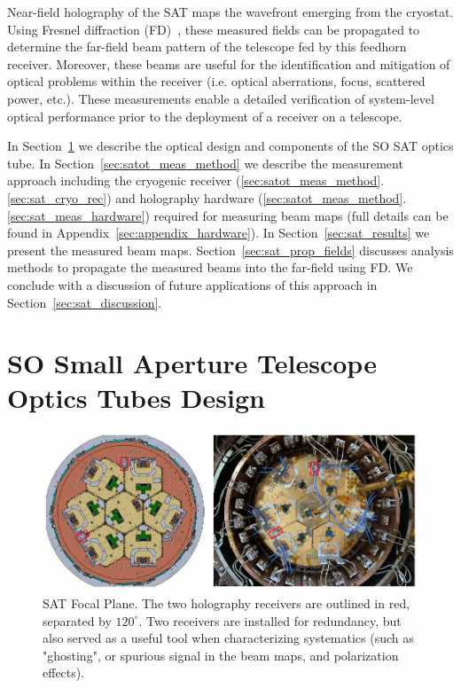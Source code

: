 Near-field holography of the SAT maps the wavefront emerging from the cryostat.  Using Fresnel diffraction (FD)~\cite{Goodman2005-ne}, these measured fields can be propagated to determine the far-field beam pattern of the telescope fed by this feedhorn receiver.  Moreover, these beams are useful for the identification and mitigation of optical problems within the receiver (i.e. optical aberrations, focus, scattered power, etc.).  These measurements enable a detailed verification of system-level optical performance prior to the deployment of a receiver on a telescope.

In Section~\ref{sec:sat_optics_tube} we describe the optical design and components of the SO SAT optics tube.  In Section~\ref{sec:satot_meas_method} we describe the measurement approach including the cryogenic receiver (\ref{sec:satot_meas_method}.\ref{sec:sat_cryo_rec}) and holography hardware (\ref{sec:satot_meas_method}.\ref{sec:sat_meas_hardware}) required for measuring beam maps (full details can be found in Appendix~\ref{sec:appendix_hardware}).  In Section~\ref{sec:sat_results} we present the measured beam maps.   Section~\ref{sec:sat_prop_fields} discusses analysis methods to propagate the measured beams into the far-field using FD.  We conclude with a discussion of future applications of this approach in Section~\ref{sec:sat_discussion}.  
\section{SO Small Aperture Telescope Optics Tubes Design}
\label{sec:sat_optics_tube}

\begin{figure}[t!]
    \centering
    \includegraphics[width = \textwidth]{Figures/sat_fpa.pdf}
    \caption{SAT Focal Plane.  The two holography receivers are outlined in red, separated by $120^{\circ}$.  Two receivers are installed for redundancy, but also served as a useful tool when characterizing systematics (such as "ghosting", or spurious signal in the beam maps, and polarization effects).}
    \label{fig:sat_fpa}
\end{figure}

